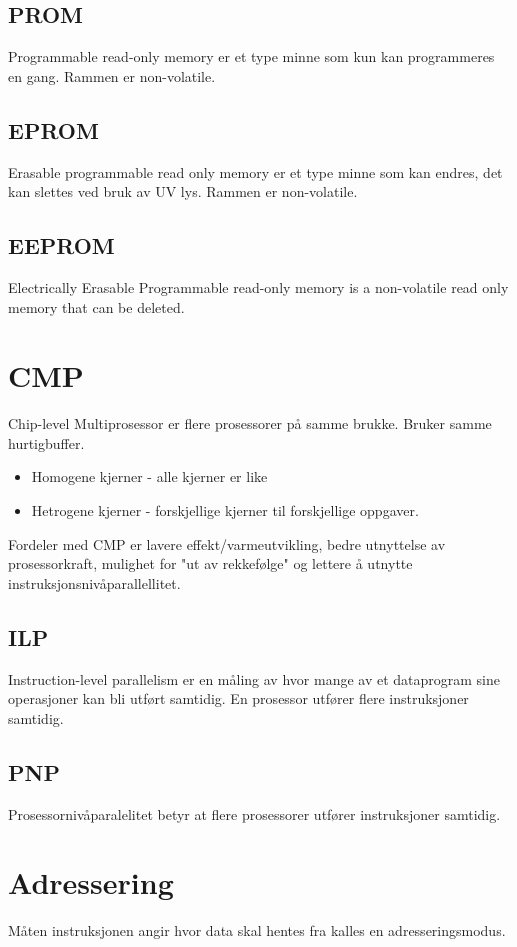 \documentclass[a4paper, 10pt]{article}
\begin{document}
\subsection{PROM}
Programmable read-only memory er et type minne som kun kan programmeres en gang. Rammen er non-volatile.
\subsection{EPROM}
Erasable programmable read only memory er et type minne som kan endres, det kan slettes ved bruk av UV lys. Rammen er non-volatile.
\subsection{EEPROM}
Electrically Erasable Programmable read-only memory is a non-volatile read only memory that can be deleted.

\section{CMP}
Chip-level Multiprosessor er flere prosessorer på samme brukke. Bruker samme hurtigbuffer.

\begin{itemize}
	\item Homogene kjerner - alle kjerner er like
	\item Hetrogene kjerner - forskjellige kjerner til forskjellige oppgaver.
\end{itemize}

Fordeler med CMP er lavere effekt/varmeutvikling, bedre utnyttelse av prosessorkraft, mulighet for "ut av rekkefølge" og lettere å utnytte instruksjonsnivåparallellitet.

\subsection{ILP}
Instruction-level parallelism er en måling av hvor mange av et dataprogram sine operasjoner kan bli utført samtidig.
En prosessor utfører flere instruksjoner samtidig. 

\subsection{PNP}
Prosessornivåparalelitet betyr at flere prosessorer utfører instruksjoner samtidig.


\section{Adressering}
Måten instruksjonen angir hvor data skal hentes fra kalles en adresseringsmodus.
\end{document}

